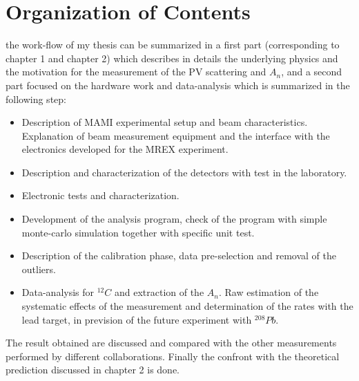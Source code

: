 \chapter*{Organization of Contents}

the work-flow of my thesis can be summarized in a first part (corresponding to chapter 1 and chapter 2) which describes in details the underlying physics and the motivation for the measurement of the PV scattering and $A_{n}$, and a second part focused on the hardware work and data-analysis which is summarized in the following step:
\begin{itemize}
\item Description of MAMI experimental setup and beam characteristics. Explanation of beam measurement equipment and the interface with the electronics developed for the MREX experiment.
\item Description and characterization of the detectors with test in the laboratory.
\item Electronic tests and characterization. 
\item Development of the analysis program, check of the program with simple monte-carlo simulation together with specific unit test.
\item Description of the calibration phase, data pre-selection and removal of the outliers.
\item Data-analysis for $^{12}C$ and extraction of the $A_{n}$. Raw estimation of the systematic effects of the measurement and determination of the rates with the lead target, in prevision of the future experiment with $^{208}Pb$.
\end{itemize}

The result obtained are discussed and compared with the other measurements performed by different collaborations. Finally the confront with the theoretical prediction discussed in chapter 2 is done.
